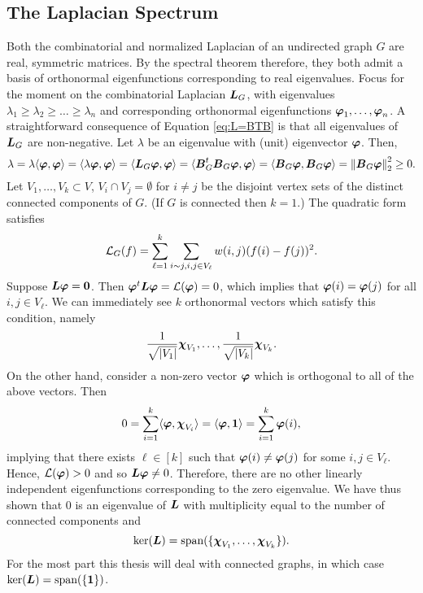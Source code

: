 \subsection{The Laplacian Spectrum}
\label{sec:background_laplacian_spectrum}
Both the combinatorial and normalized Laplacian of an undirected graph $G$ are real, symmetric matrices. By the spectral theorem therefore, they both admit a basis of orthonormal eigenfunctions corresponding to real eigenvalues. Focus for the moment on the combinatorial Laplacian  $\vb*{L}_G$, with eigenvalues $\lambda_1\geq \lambda_2\geq \dots \geq \lambda_n$ and corresponding orthonormal eigenfunctions $\vb*{\varphi}_1,\dots,\vb*{\varphi}_n$. A straightforward consequence of Equation \ref{eq:L=BTB} is that all eigenvalues of $\vb*{L}_G$ are non-negative. Let $\lambda$ be an eigenvalue with (unit) eigenvector $\vb*{\varphi}$. Then,  \begin{equation*}
    \lambda = \lambda\langle \vb*{\varphi},\vb*{\varphi}\rangle = \langle \lambda \vb*{\varphi},\vb*{\varphi}\rangle = \langle \vb*{L}_G\vb*{\varphi},\vb*{\varphi}\rangle = \langle \vb*{B}_G^t \vb*{B}_G\vb*{\varphi},\vb*{\varphi}\rangle = \langle \vb*{B}_G\vb*{\varphi},\vb*{B}_G\vb*{\varphi}\rangle =\norm{\vb*{B}_G\vb*{\varphi}}_2^2 \geq 0.
\end{equation*}
Let $V_1,\dots,V_k\subset V$, $V_i\cap V_j= \emptyset$ for $i\neq j$ be the disjoint vertex sets of the distinct connected components of $G$. (If $G$ is connected then $k=1$.) The quadratic form satisfies
\[\mathcal{L}_G(f) = \sum_{\ell=1}^k \sum_{i\sim j, i,j\in V_\ell} w(i,j)(f(i)-f(j))^2. \]
Suppose $\vb*{L}\vb*{\varphi}=\vb{0}$. Then $\vb*{\varphi}^t\vb*{L}\vb*{\varphi}=\mathcal{L}(\vb*{\varphi})=0$, which implies that $\vb*{\varphi}(i)=\vb*{\varphi}(j)$ for all $i,j\in V_\ell$. We can immediately see $k$ orthonormal vectors which satisfy this condition, namely \[\frac{1}{\sqrt{|V_1|}} \boldsymbol{\chi}_{V_1},\dots, \frac{1}{\sqrt{|V_k|}} \boldsymbol{\chi}_{V_k}.\]
On the other hand, consider a non-zero vector $\vb*{\varphi}$ which is orthogonal to all of the above vectors. Then 
\[0=\sum_{i=1}^k \langle \vb*{\varphi},\boldsymbol{\chi}_{V_i}\rangle = \langle \vb*{\varphi},\vb{1} \rangle=\sum_{i=1}^k \vb*{\varphi}(i),\]
implying that there exists $\ell\in[k]$ such that $\vb*{\varphi}(i)\neq\vb*{\varphi}(j)$ for some $i,j\in V_\ell$. Hence, $\mathcal{L}(\vb*{\varphi})>0$ and so $\vb*{L}\vb*{\varphi}\neq 0$. Therefore, there are no other linearly independent eigenfunctions corresponding to the zero eigenvalue.  
We have thus shown that 0 is an eigenvalue of $\vb*{L}$ with multiplicity equal to the number of connected components and 
\[\ker(\vb*{L})=\textnormal{span}(\{\boldsymbol{\chi}_{V_1},\dots,\boldsymbol{\chi}_{V_k}\}).\]
For the most part this thesis will deal with connected graphs, in which case $\ker(\vb*{L})=\textnormal{span}(\{\vb{1}\})$.  


